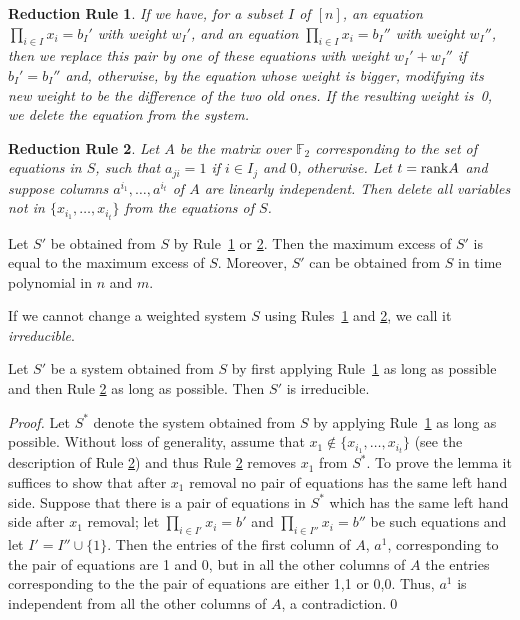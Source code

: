 \documentclass{llncs}
\newtheorem{krule}{Reduction Rule}
\begin{document}
  \begin{krule}\label{rule1}
  If we have, for a subset $I$ of $[n]$, an equation $\prod_{i \in I} x_i =b_I'$
  with weight $w_I'$, and an equation $\prod_{i \in I} x_i =b_I''$ with weight $w_I''$,
  then we replace this pair by one of these equations with weight $w_I'+w_I''$ if $b_I'=b_I''$ and, otherwise, by
  the equation whose weight is bigger, modifying its
  new weight to be the difference of the two old ones. If the resulting weight
  is~0, we delete the equation from the system.
  \end{krule}
    \begin{krule}\label{rulerank}
Let $A$ be the matrix over $\mathbb{F}_2$ corresponding to the set of equations in $S$, such that $a_{ji} = 1$ if $i \in I_j$ and $0$, otherwise.
  Let $t={\rm rank} A$ and suppose columns $a^{i_1},\ldots ,a^{i_t}$ of $A$ are linearly independent.
  Then delete all variables not in $\{x_{i_1},\ldots ,x_{i_t}\}$ from the equations of $S$.
  \end{krule}
  \begin{lemma}\label{lem:SS'}\cite{GutKimSzeYeo11}
  Let $S'$ be obtained from $S$ by Rule~\ref{rule1} or \ref{rulerank}.
  Then the maximum excess of $S'$  is equal to the maximum excess of $S$.
  Moreover, $S'$ can be obtained from $S$ in time polynomial in $n$ and $m$.
  \end{lemma}
If we cannot change a weighted system $S$ using  Rules~\ref{rule1} and \ref{rulerank}, we call it {\em irreducible}.

\begin{lemma}\label{lem:irred}
Let $S'$ be a system obtained from $S$ by first applying Rule~\ref{rule1} as long as possible and then Rule \ref{rulerank} as long as possible. Then $S'$ is irreducible.
\end{lemma}
\begin{proof}
Let $S^*$ denote the system obtained from $S$ by applying Rule~\ref{rule1} as long as possible. Without loss of generality, assume that $x_1\not\in \{x_{i_1},\ldots ,x_{i_t}\}$ (see the description of Rule \ref{rulerank}) and thus Rule \ref{rulerank} removes $x_1$ from $S^*$. To prove the lemma
it suffices to show that after $x_1$ removal no pair of equations has the same left hand side. Suppose that there is a pair of equations in $S^*$ which has the same left hand side after $x_1$ removal; let $\prod_{i \in I'} x_i =b'$
and $\prod_{i \in I''} x_i =b''$ be such equations and let $I'=I''\cup \{1\}$. Then the entries of the first column of $A$, $a^1$, corresponding to the pair of equations are 1 and 0, but in all the other columns of $A$ the entries corresponding to the the pair of equations are either 1,1 or 0,0. Thus, $a^1$ is independent from all the other columns of $A$, a contradiction.\qed
\end{proof}
\end{document}
